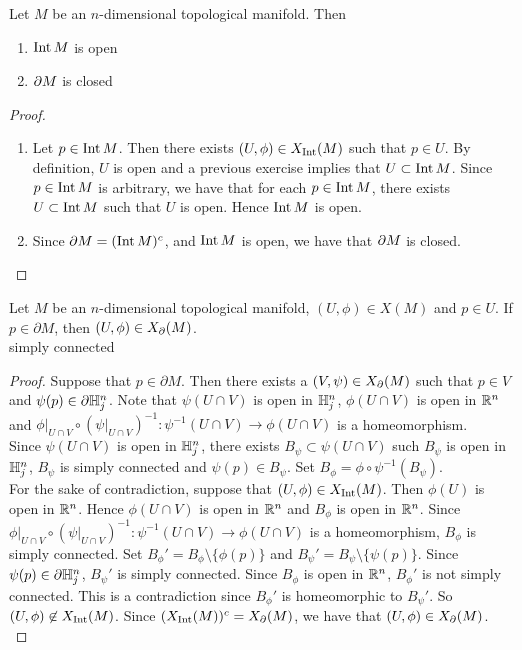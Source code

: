 \documentclass{book}
\begin{document}
	\begin{ex} 
		Let $M$ be an $n$-dimensional topological manifold. Then 
		\begin{enumerate}
			\item $\operatorname{Int} M$ is open
			\item $\partial M$ is closed
		\end{enumerate}
	\end{ex}
	
	\begin{proof}\
		\begin{enumerate}
			\item Let $p \in \operatorname{Int} M$. Then there exists $(U, \phi) \in X_{\operatorname{Int}}(M)$ such that $p \in U$. By definition, $U$ is open and a previous exercise implies that $U \subset \operatorname{Int} M$. Since $p \in \operatorname{Int} M$ is arbitrary, we have that for each $p \in \operatorname{Int} M$, there exists $U \subset \operatorname{Int} M$ such that $U$ is open. Hence $\operatorname{Int} M$ is open. 
			\item Since $\partial M = (\operatorname{Int} M)^c$, and $\operatorname{Int} M$ is open, we have that $\partial M$ is closed.
		\end{enumerate}
	\end{proof}

	\begin{ex} 
		Let $M$ be an $n$-dimensional topological manifold, $(U, \phi) \in X(M)$ and $p \in U$. If $p \in \partial M$, then $(U, \phi) \in X_{\partial}(M)$. \\
		\tbf{Hint:} simply connected
	\end{ex}

	\begin{proof}
		Suppose that $p \in \partial M$. Then there exists a $(V, \psi) \in X_{\partial}(M)$ such that $p \in V$ and $\psi(p) \in \partial \mathbb{H}^n_j $. Note that $\psi(U \cap V)$ is open in $\mathbb{H}^n_j $, $\phi(U \cap V)$ is open in $\mathbb{R}^n$ and $\phi|_{U \cap V} \circ (\psi|_{U \cap V})^{-1}: \psi^{-1}(U \cap V) \rightarrow \phi(U \cap V)$ is a homeomorphism. \\
		Since $\psi(U \cap V)$ is open in $\mathbb{H}^n_j $, there exists $B_{\psi} \subset \psi(U \cap V)$ such $B_{\psi}$ is open in $\mathbb{H}^n_j $, $B_{\psi}$ is simply connected and $\psi(p) \in B_{\psi}$. Set $B_{\phi} = \phi \circ \psi^{-1}(B_{\psi})$. \\
		For the sake of contradiction, suppose that $(U, \phi) \in X_{\operatorname{Int}}(M)$. Then $\phi(U)$ is open in $\mathbb{R}^n$. Hence $\phi(U \cap V)$ is open in $\mathbb{R}^n$ and $B_{\phi}$ is open in $\mathbb{R}^n$. Since $\phi|_{U \cap V} \circ (\psi|_{U \cap V})^{-1}: \psi^{-1}(U \cap V) \rightarrow \phi(U \cap V)$ is a homeomorphism, $B_{\phi}$ is simply connected. Set $B_{\phi}' = B_{\phi} \setminus \{\phi(p)\}$ and $B_{\psi}' = B_{\psi} \setminus \{\psi(p)\}$. Since $\psi(p) \in \partial \mathbb{H}^n_j $, $B_{\psi}'$ is simply connected. Since $B_{\phi}$ is open in $\mathbb{R}^n$, $B_{\phi}'$ is not simply connected. This is a contradiction since $B_{\phi}'$ is homeomorphic to $B_{\psi}'$. So $(U, \phi) \not \in X_{\operatorname{Int}}(M)$. Since $(X_{\operatorname{Int}}(M))^c = X_{\partial}(M)$, we have that $(U, \phi) \in X_{\partial}(M)$.\\
	\end{proof}
\end{document}
